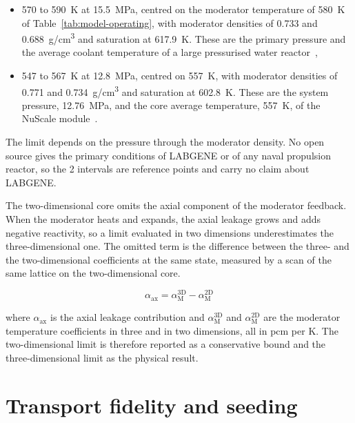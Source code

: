 \begin{itemize}
  \item 570 to \SI{590}{K} at \SI{15.5}{MPa}, centred on the moderator
        temperature of \SI{580}{K} of Table~\ref{tab:model-operating},
        with moderator densities of 0.733 and \SI{0.688}{g/cm^3}
        and saturation at \SI{617.9}{K}.
        These are the primary pressure and the average coolant
        temperature of a large pressurised water
        reactor~\cite{todreas_kazimi_2012,epr_fsar_ch4},

  \item 547 to \SI{567}{K} at \SI{12.8}{MPa}, centred on \SI{557}{K},
        with moderator densities of 0.771 and \SI{0.734}{g/cm^3}
        and saturation at \SI{602.8}{K}.
        These are the system pressure, \SI{12.76}{MPa}, and the core
        average temperature, \SI{557}{K}, of the NuScale
        module~\cite{nuscale_htp2_2017}.
\end{itemize}

The limit depends on the pressure through the moderator density. No
open source gives the primary conditions of LABGENE or of any naval
propulsion reactor, so the 2 intervals are reference points and carry
no claim about LABGENE.

The two-dimensional core omits the axial component of the moderator
feedback. When the moderator heats and expands, the axial leakage grows
and adds negative reactivity, so a limit evaluated in two dimensions
underestimates the three-dimensional one. The omitted term is the difference between the three- and
the two-dimensional coefficients at the same state, measured by a scan
of the same lattice on the two-dimensional core.

\begin{equation}
\alpha_\mathrm{ax} = \alpha_\mathrm{M}^\mathrm{3D} - \alpha_\mathrm{M}^\mathrm{2D}
\label{eq:axial-feedback}
\end{equation}

\noindent where $\alpha_\mathrm{ax}$ is the axial leakage contribution
and $\alpha_\mathrm{M}^\mathrm{3D}$ and $\alpha_\mathrm{M}^\mathrm{2D}$
are the moderator temperature coefficients in three and in two
dimensions, all in pcm per K. The two-dimensional limit is therefore
reported as a conservative bound and the three-dimensional limit as
the physical result.

\section{Transport fidelity and seeding}
\label{sec:meth-fidelity}

